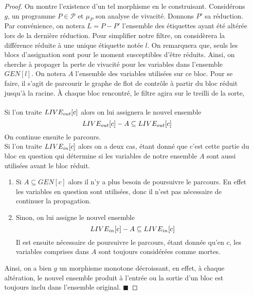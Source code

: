 \documentclass[a4paper, 12pt]{article}
\begin{document}
\begin{proof}
	On montre l'existence d'un tel morphisme en le construisant. Considérons $g$, un programme $P \in \mathcal{P}$ et $\mu_P$ son analyse
	de vivacité. Donnons $P'$ sa réduction. Par convénience, on notera $L = P - P'$ l'ensemble des étiquettes
	ayant été altérée lors de la dernière réduction. Pour simplifier notre filtre, on considèrera la différence réduite à une unique étiquette notée $l$.
	On remarquera que, seuls les blocs d'assignation sont pour le moment susceptibles d'être réduits. Ainsi, on cherche à propager la perte de vivacité pour les variables
	dans l'ensemble $GEN[l]$. On notera $A$ l'ensemble des variables utilisées sur ce bloc. Pour se faire, il s'agit de parcourir le graphe de flot de contrôle
	à partir du bloc réduit jusqu'à la racine. À chaque bloc rencontré, le filtre agira sur le treilli de la sorte,
	\\
	\\
	Si l'on traite $LIVE_{out}[c]$ alors on lui assignera le nouvel ensemble 
	\[LIVE_{out}[c] - A \subseteq LIVE_{out}[c]\] 
	On continue ensuite le parcours.
	\\
	Si l'on traite $LIVE_{in}[c]$ alors on a deux cas, étant donné que c'est cette partie du bloc en question qui détermine si les variables
	de notre ensemble $A$ sont aussi utilisées avant le bloc réduit.
	\begin{enumerate}
		\item Si $A \subseteq GEN[c]$ alors il n'y a plus besoin de poursuivre le parcours. En effet les variables en question sont utilisées, donc il n'est pas nécessaire
		de continuer la propagation.\\
		\item Sinon, on lui assigne le nouvel ensemble
		\[LIVE_{in}[c] - A \subseteq LIVE_{in}[c]\]
		Il est ensuite nécessaire de poursuivre le parcours, étant donnée qu'en $c$, les variables comprises dans $A$ sont toujours considérées comme mortes.
	\end{enumerate}
	Ainsi, on a bien $g$ un morphisme monotone décroissant, en effet, à chaque altération, le nouvel ensemble produit à l'entrée ou la sortie d'un bloc est toujours
	inclu dans l'ensemble original.
	\hfill $\blacksquare$
\end{proof}
\end{document}
